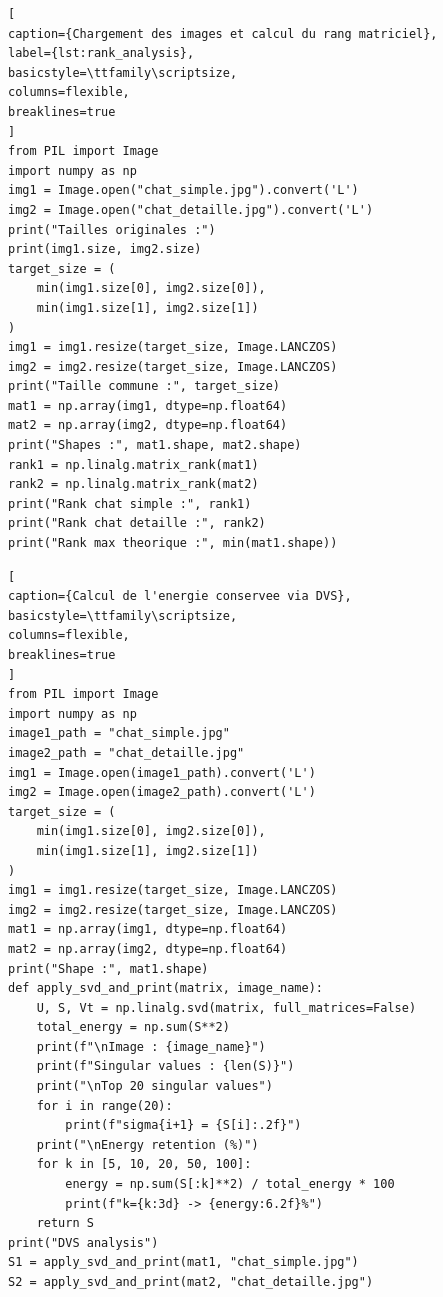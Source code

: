 \documentclass[12pt]{report}
\begin{document}
\clearpage


\begin{lstlisting}[
caption={Chargement des images et calcul du rang matriciel},
label={lst:rank_analysis},
basicstyle=\ttfamily\scriptsize,
columns=flexible,
breaklines=true
]
from PIL import Image
import numpy as np
img1 = Image.open("chat_simple.jpg").convert('L')
img2 = Image.open("chat_detaille.jpg").convert('L')
print("Tailles originales :")
print(img1.size, img2.size)
target_size = (
    min(img1.size[0], img2.size[0]),
    min(img1.size[1], img2.size[1])
)
img1 = img1.resize(target_size, Image.LANCZOS)
img2 = img2.resize(target_size, Image.LANCZOS)
print("Taille commune :", target_size)
mat1 = np.array(img1, dtype=np.float64)
mat2 = np.array(img2, dtype=np.float64)
print("Shapes :", mat1.shape, mat2.shape)
rank1 = np.linalg.matrix_rank(mat1)
rank2 = np.linalg.matrix_rank(mat2)
print("Rank chat simple :", rank1)
print("Rank chat detaille :", rank2)
print("Rank max theorique :", min(mat1.shape))
\end{lstlisting}
\begin{lstlisting}[
caption={Calcul de l'energie conservee via DVS},
basicstyle=\ttfamily\scriptsize,
columns=flexible,
breaklines=true
]
from PIL import Image
import numpy as np
image1_path = "chat_simple.jpg"
image2_path = "chat_detaille.jpg"
img1 = Image.open(image1_path).convert('L')
img2 = Image.open(image2_path).convert('L')
target_size = (
    min(img1.size[0], img2.size[0]),
    min(img1.size[1], img2.size[1])
)
img1 = img1.resize(target_size, Image.LANCZOS)
img2 = img2.resize(target_size, Image.LANCZOS)
mat1 = np.array(img1, dtype=np.float64)
mat2 = np.array(img2, dtype=np.float64)
print("Shape :", mat1.shape)
def apply_svd_and_print(matrix, image_name):
    U, S, Vt = np.linalg.svd(matrix, full_matrices=False)
    total_energy = np.sum(S**2)
    print(f"\nImage : {image_name}")
    print(f"Singular values : {len(S)}")
    print("\nTop 20 singular values")
    for i in range(20):
        print(f"sigma{i+1} = {S[i]:.2f}")
    print("\nEnergy retention (%)")
    for k in [5, 10, 20, 50, 100]:
        energy = np.sum(S[:k]**2) / total_energy * 100
        print(f"k={k:3d} -> {energy:6.2f}%")
    return S
print("DVS analysis")
S1 = apply_svd_and_print(mat1, "chat_simple.jpg")
S2 = apply_svd_and_print(mat2, "chat_detaille.jpg")
\end{lstlisting}
\clearpage
\end{document}
